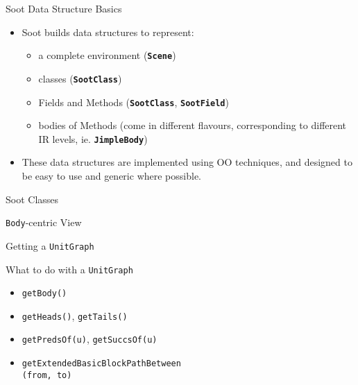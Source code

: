 \begin{slide}{Soot Data Structure Basics}
\begin{itemize}
\item
Soot builds data structures to represent: 
\begin{itemize}
\item a complete environment (\textbf{\texttt{Scene}}) 
\item classes (\textbf{\texttt{SootClass}}) 
\item Fields and Methods (\textbf{\texttt{SootClass}}, \textbf{\texttt{SootField}})
\item bodies of Methods (come in different flavours, corresponding to 
         different IR levels, ie. \textbf{\texttt{JimpleBody}})
\end{itemize}
\item
These data structures are implemented using OO techniques, and designed 
to be easy to use and generic where possible.  
\end{itemize}
\end{slide}

\begin{slide}{Soot Classes}
\vspace*{-0.1in}
\begin{center}

\end{center}
\end{slide}

\begin{slide}{{\tt Body}-centric View}
\begin{center}

\end{center}
\end{slide}

\begin{slide}{Getting a {\tt UnitGraph}}
\begin{center}

\end{center}
\end{slide}

\begin{slide}{What to do with a {\tt UnitGraph}}
\begin{itemize}
\item {\tt getBody()}
\item {\tt getHeads()}, {\tt getTails()}
\item {\tt getPredsOf(u)}, {\tt getSuccsOf(u)}
\item {\tt getExtendedBasicBlockPathBetween\\
                (from, to)}
\end{itemize}
\end{slide}

